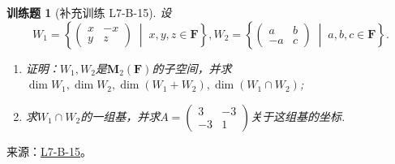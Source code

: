 \documentclass[12pt,fontset=fandol]{ctexart}
\newtheorem{exercise}{训练题}[section]
\begin{document}
\begin{exercise}[补充训练 L7-B-15]\label{prob:L7-B-15}
设\[W_1=\left\{\begin{pmatrix}
            x & -x \\ y & z
        \end{pmatrix} \;\middle|\; x,y,z\in \mathbf{F} \right\},W_2=\left\{\begin{pmatrix}
            a & b \\ -a & c
        \end{pmatrix} \;\middle|\; a,b,c\in \mathbf{F} \right\}.\]

        \begin{enumerate}
            \item 证明：$W_1,W_2$是$\mathbf{M}_2(\mathbf{F})$的子空间，并求$\dim W_1,\dim W_2,\dim(W_1+W_2),\dim(W_1\cap W_2)$;

            \item 求$W_1\cap W_2$的一组基，并求$A=\begin{pmatrix}
                        3 & -3 \\ -3 & 1
                    \end{pmatrix}$关于这组基的坐标.
        \end{enumerate}
\end{exercise}
\noindent 来源：\href{https://github.com/yhwu-is/Linear-Algebra-Left-Undone/blob/new/%E8%AE%B2%E4%B9%89/%E4%B8%93%E9%A2%98/7%20%E7%BA%BF%E6%80%A7%E6%98%A0%E5%B0%84%E7%9F%A9%E9%98%B5%E8%A1%A8%E7%A4%BA%E4%B8%8E%E7%9F%A9%E9%98%B5%E8%BF%90%E7%AE%97%E5%9F%BA%E7%A1%80.tex}{L7-B-15}。
\end{document}
